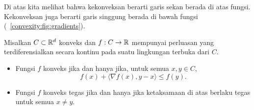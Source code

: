 Di atas kita melihat bahwa kekonveksan berarti garis sekan berada di atas fungsi. Kekonveksan juga berarti garis singgung berada di bawah fungsi (\cf~\cref{convexity:fig:gradients}).

\begin{theorem}\label{convexity:thm:first_order}
    Misalkan $C\subset\mathbb{R}^d$ konveks dan $f:C\rightarrow\mathbb{R}$ mempunyai perluasan
    yang terdiferensialkan secara kontinu pada suatu lingkungan terbuka dari $C$.
    \begin{itemize}
        \item Fungsi $f$ konveks jika dan hanya jika, untuk semua $x,y\in C$,
        \[
            f(x)+\langle\nabla f(x),y-x\rangle\leq f(y).
        \]
        \item Fungsi $f$ konveks tegas jika dan hanya jika ketaksamaan di atas berlaku tegas untuk semua $x\neq y$.
    \end{itemize}
\end{theorem}

